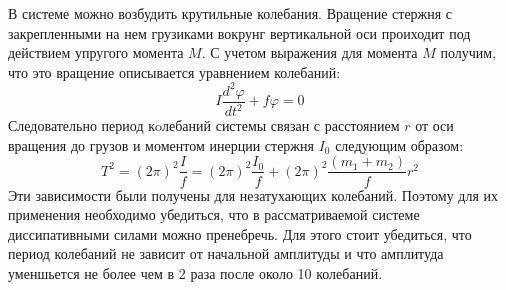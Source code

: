 \documentclass[a4paper,12pt]{article} %
\begin{document}
%
%
В системе можно возбудить крутильные колебания. Вращение стержня с закрепленными
на нем грузиками вокрунг вертикальной оси проиходит под действием упругого момента $M$.
С учетом выражения для момента $M$ получим, что это вращение описывается уравнением колебаний:
\begin{equation}
    I\frac{d^2 \varphi }{d t^2} + f \varphi =0
\end{equation}
Следовательно период кoлебаний системы связан с расстоянием $r$ от оси вращения до грузов и
моментом инерции стержня $I_0$ следующим образом:
\begin{equation}
    T^2=(2\pi)^2\frac{I}{f}=(2\pi)^2\frac{I_0}{f}+(2\pi)^2\frac{(m_1+m_2)}{f}r^2
\end{equation}
Эти зависимости были получены для незатухающих колебаний. Поэтому для их применения необходимо убедиться,
что в рассматриваемой системе диссипативными силами можно пренебречь. Для этого стоит убедиться, что период колебаний
не зависит от начальной амплитуды и что амплитуда уменшьется не более чем в 2 раза после около 10 колебаний.
\end{document}
